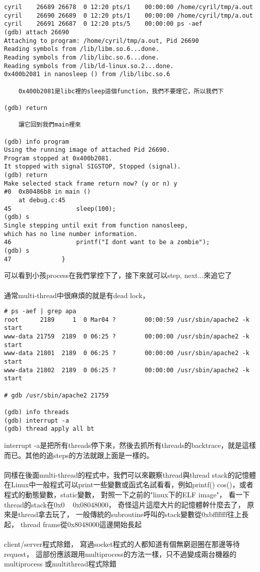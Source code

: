   \begin{verbatim}	
cyril    26689 26678  0 12:20 pts/1    00:00:00 /home/cyril/tmp/a.out
cyril    26690 26689  0 12:20 pts/1    00:00:00 /home/cyril/tmp/a.out
cyril    26691 26687  0 12:20 pts/5    00:00:00 ps -aef
(gdb) attach 26690
Attaching to program: /home/cyril/tmp/a.out, Pid 26690
Reading symbols from /lib/libm.so.6...done.
Reading symbols from /lib/libc.so.6...done.
Reading symbols from /lib/ld-linux.so.2...done.
0x400b2081 in nanosleep () from /lib/libc.so.6
	
	0x400b2081是libc裡的sleep這個function，我們不要理它，所以我們下
	
(gdb) return
	
	讓它回到我們main裡來
	
(gdb) info program
Using the running image of attached Pid 26690.
Program stopped at 0x400b2081.
It stopped with signal SIGSTOP, Stopped (signal).
(gdb) return 
Make selected stack frame return now? (y or n) y
#0  0x80486b8 in main ()
    at debug.c:45
45                  sleep(100);
(gdb) s
Single stepping until exit from function nanosleep, 
which has no line number information.
46                  printf("I dont want to be a zombie");
(gdb) s
47              }
  \end{verbatim}
  可以看到小孩process在我們掌控下了，接下來就可以step, next...來追它了
  \\\\
  通常multi-thread中很麻煩的就是有dead lock，
  \begin{verbatim}
# ps -aef | grep apa
root      2189     1  0 Mar04 ?        00:00:59 /usr/sbin/apache2 -k start
www-data 21759  2189  0 06:25 ?        00:00:00 /usr/sbin/apache2 -k start
www-data 21801  2189  0 06:25 ?        00:00:00 /usr/sbin/apache2 -k start
www-data 21802  2189  0 06:25 ?        00:00:00 /usr/sbin/apache2 -k start

# gdb /usr/sbin/apache2 21759

(gdb) info threads
(gdb) interrupt -a
(gdb) thread apply all bt
  \end{verbatim}
  interrupt -a是把所有threads停下來，然後去抓所有threads的backtrace，就是這樣
  而已。其他的追steps的方法就跟上面是一樣的。
  \\\\
  同樣在後面multi-thread的程式中，我們可以來觀察thread與thread stack的記憶體
  在Linux中一般程式可以print一些變數或函式名試看看，例如printf() cos()，或者
  程式的動態變數，static變數， 對照一下之前的"linux下的ELF image"，
  看一下thread的stack在0x0 ~ 0x08048000，
  奇怪這片這麼大片的記憶體幹什麼去了， 原來是thread拿去玩了，
  一般傳統的subroutine呼叫的stack變數從0xbfffffff往上長起，
  thread frame從0x8048000這邊開始長起
  \\\\
  client/server程式除錯， 寫過socket程式的人都知道有個無窮迴圈在那邊等待request，
  這部份應該跟用multiprocess的方法一樣，只不過變成兩台機器的multiprocess
  或multithread程式除錯	
  
